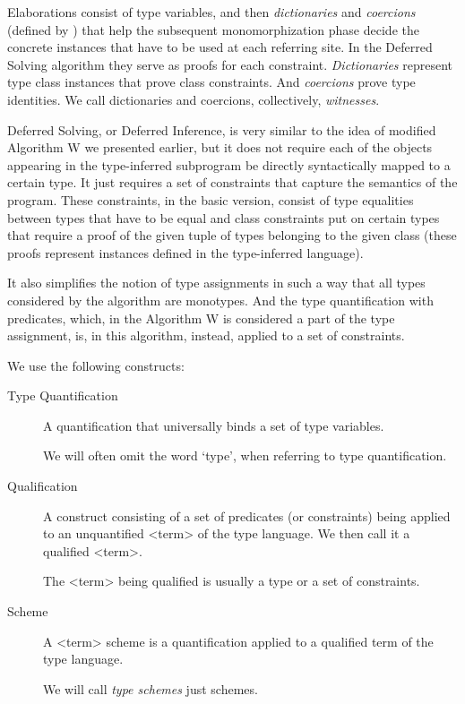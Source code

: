 Elaborations consist of type variables, and then \emph{dictionaries} and \emph{coercions} (defined by \citet{vytiniotis2011outsidein}) that help the subsequent monomorphization phase decide the concrete instances that have to be used at each referring site. In the Deferred Solving algorithm they serve as proofs for each constraint. \emph{Dictionaries} represent type class instances that prove class constraints. And \emph{coercions} prove type identities. We call dictionaries and coercions, collectively, \emph{witnesses}.

Deferred Solving, or Deferred Inference, is very similar to the idea of modified Algorithm W we presented earlier, but it does not require each of the objects appearing in the type-inferred subprogram be directly syntactically mapped to a certain type. It just requires a set of constraints that capture the semantics of the program. These constraints, in the basic version, consist of type equalities between types that have to be equal and class constraints put on certain types that require a proof of the given tuple of types belonging to the given class (these proofs represent instances defined in the type-inferred language).

It also simplifies the notion of type assignments in such a way that all types considered by the algorithm are monotypes. And the type quantification with predicates, which, in the Algorithm W is considered a part of the type assignment, is, in this algorithm, instead, applied to a set of constraints.

We use the following constructs:


\begin{description}
    \item[Type Quantification] A quantification that universally binds a set of type variables.

    We will often omit the word `type', when referring to type quantification.

    \item[Qualification] A construct consisting of a set of predicates (or constraints) being applied to an unquantified <term> of the type language. We then call it a qualified <term>.

    The <term> being qualified is usually a type or a set of constraints.

    \item[Scheme] A <term> scheme is a quantification applied to a qualified term of the type language.

    We will call \emph{type schemes} just schemes.
\end{description}

